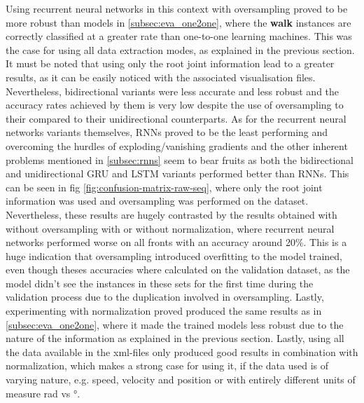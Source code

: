 		Using recurrent neural networks in this context with oversampling proved to be more robust than models in \ref{subsec:eva_one2one}, where the \textbf{walk} instances are correctly classified at a greater rate than one-to-one learning machines. This was the case for using all data extraction modes, as explained in the previous section. It must be noted that using only the root joint information lead to a greater results, as it can be easily noticed with the associated visualisation files. Nevertheless, bidirectional variants were less accurate and less robust and the accuracy rates achieved by them is very low despite the use of oversampling to their compared to their unidirectional counterparts. As for the recurrent neural networks variants themselves, RNNs proved to be the least performing and overcoming the hurdles of exploding/vanishing gradients and the other inherent problems mentioned in \ref{subsec:rnns} seem to bear fruits as both the bidirectional and unidirectional GRU and LSTM variants performed better than RNNs. This can be seen in fig \ref{fig:confusion-matrix-raw-seq}, where only the root joint information was used and oversampling was performed on the dataset. Nevertheless, these results are hugely contrasted by the results obtained with without oversampling with or without normalization, where recurrent neural networks performed worse on all fronts with an accuracy around 20\%. This is a huge indication that oversampling introduced overfitting to the model trained, even though theses accuracies where calculated on the validation dataset, as the model didn't see the instances in these sets for the first time during the validation process due to the duplication involved in oversampling. Lastly, experimenting with normalization proved produced the same results as in \ref{subsec:eva_one2one}, where it made the trained models less robust due to the nature of the information as explained in the previous section. Lastly, using all the data available in the xml-files only produced good results in combination with normalization, which makes a strong case for using it, if the data used is of varying nature, e.g. speed, velocity and position or with entirely different units of measure rad vs °.
